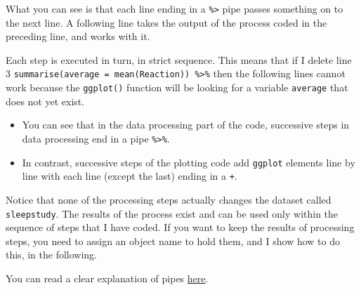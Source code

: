 \documentclass[
  letterpaper,
  DIV=11,
  numbers=noendperiod]{scrreprt}
\providecommand{\tightlist}{%
  \setlength{\itemsep}{0pt}\setlength{\parskip}{0pt}}\usepackage{longtable,booktabs,array}
\begin{document}
What you can see is that each line ending in a \texttt{\%\textgreater{}}
pipe passes something on to the next line. A following line takes the
output of the process coded in the preceding line, and works with it.

Each step is executed in turn, in strict sequence. This means that if I
delete line 3
\texttt{summarise(average\ =\ mean(Reaction))\ \%\textgreater{}\%} then
the following lines cannot work because the \texttt{ggplot()} function
will be looking for a variable \texttt{average} that does not yet exist.

\begin{tcolorbox}[enhanced jigsaw, opacitybacktitle=0.6, title=\textcolor{quarto-callout-warning-color}{\faExclamationTriangle}\hspace{0.5em}{Warning}, arc=.35mm, colbacktitle=quarto-callout-warning-color!10!white, colframe=quarto-callout-warning-color-frame, leftrule=.75mm, opacityback=0, breakable, titlerule=0mm, left=2mm, bottomrule=.15mm, toprule=.15mm, colback=white, coltitle=black, bottomtitle=1mm, toptitle=1mm, rightrule=.15mm]

\begin{itemize}
\tightlist
\item
  You can see that in the data processing part of the code, successive
  steps in data processing end in a pipe \texttt{\%\textgreater{}\%}.
\item
  In contrast, successive steps of the plotting code add \texttt{ggplot}
  elements line by line with each line (except the last) ending in a
  \texttt{+}.
\end{itemize}

\end{tcolorbox}

Notice that none of the processing steps actually changes the dataset
called \texttt{sleepstudy}. The results of the process exist and can be
used only within the sequence of steps that I have coded. If you want to
keep the results of processing steps, you need to assign an object name
to hold them, and I show how to do this, in the following.

You can read a clear explanation of pipes
\href{https://r4ds.had.co.nz/pipes.html}{here}.
\end{document}
